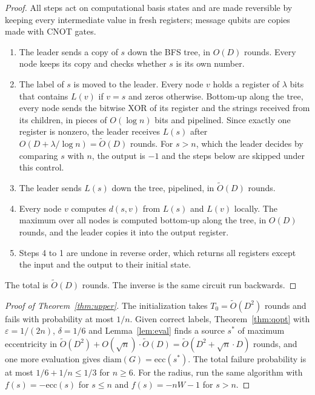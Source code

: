 \documentclass[11pt]{article}
\theoremstyle{definition}
\theoremstyle{remark}
\newcommand{\ecc}{\mathrm{ecc}}
\newcommand{\diam}{\mathrm{diam}}
\newcommand{\Ot}{\tilde O}
\begin{document}
\begin{proof}
All steps act on computational basis states and are made reversible by keeping every intermediate value in fresh registers; message qubits are copies made with CNOT gates.
\begin{enumerate}[1.]
\item The leader sends a copy of $s$ down the BFS tree, in $O(D)$ rounds. Every node keeps its copy and checks whether $s$ is its own number.
\item The label of $s$ is moved to the leader. Every node $v$ holds a register of $\lambda$ bits that contains $L(v)$ if $v=s$ and zeros otherwise. Bottom-up along the tree, every node sends the bitwise XOR of its register and the strings received from its children, in pieces of $O(\log n)$ bits and pipelined. Since exactly one register is nonzero, the leader receives $L(s)$ after $O(D+\lambda/\log n)=\Ot(D)$ rounds. For $s>n$, which the leader decides by comparing $s$ with $n$, the output is $-1$ and the steps below are skipped under this control.
\item The leader sends $L(s)$ down the tree, pipelined, in $\Ot(D)$ rounds.
\item Every node $v$ computes $d(s,v)$ from $L(s)$ and $L(v)$ locally. The maximum over all nodes is computed bottom-up along the tree, in $O(D)$ rounds, and the leader copies it into the output register.
\item Steps 4 to 1 are undone in reverse order, which returns all registers except the input and the output to their initial state.
\end{enumerate}
The total is $\Ot(D)$ rounds. The inverse is the same circuit run backwards.
\end{proof}

\begin{proof}[Proof of Theorem~\ref{thm:upper}]
The initialization takes $T_0=\Ot(D^2)$ rounds and fails with probability at most $1/n$. Given correct labels, Theorem~\ref{thm:qopt} with $\varepsilon=1/(2n)$, $\delta=1/6$ and Lemma~\ref{lem:eval} finds a source $s^*$ of maximum eccentricity in $\Ot(D^2)+O(\sqrt n)\cdot\Ot(D)=\Ot(D^2+\sqrt n\cdot D)$ rounds, and one more evaluation gives $\diam(G)=\ecc(s^*)$. The total failure probability is at most $1/6+1/n\le 1/3$ for $n\ge 6$. For the radius, run the same algorithm with $f(s)=-\ecc(s)$ for $s\le n$ and $f(s)=-nW-1$ for $s>n$.
\end{proof}
\end{document}
